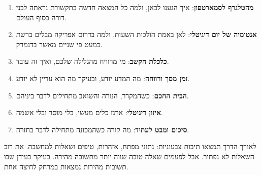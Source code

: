 \begin{enumerate}[start=2]
  \item \textbf{מהטלגרף לסמארטפון}: איך הגענו לכאן, ולמה כל המצאה חדשה בתקשורת נראתה לבני דורה כסוף העולם.
  \item \textbf{אנטומיה של יום דיגיטלי}: לאן באמת הולכות השעות, ולמה בדרום אפריקה מבלים ברשת כמעט פי שניים מאשר בדנמרק.
  \item \textbf{כלכלת הקשב}: מי מרוויח מהגלילה שלכם, ואיך זה עובד.
  \item \textbf{זמן מסך ורווחה}: מה המדע יודע, ובעיקר מה הוא עדיין לא יודע.
  \item \textbf{הבית החכם}: כשהמקרר, הנורה והשואב מתחילים לדבר ביניהם.
  \item \textbf{איזון דיגיטלי}: ארגז כלים מעשי, בלי מוסר ובלי אשמה.
  \item \textbf{סיכום ומבט לעתיד}: מה קורה כשהמכונה מתחילה לדבר בחזרה.
\end{enumerate}

לאורך הדרך תמצאו תיבות צבעוניות: נתוני מפתח, אזהרות, טיפים ושאלות למחשבה. את רוב השאלות לא נפתור. אבל לפעמים שאלה טובה שווה יותר מתשובה מהירה. בעיקר בעידן שבו תשובות מהירות נמצאות במרחק לחיצה אחת.
